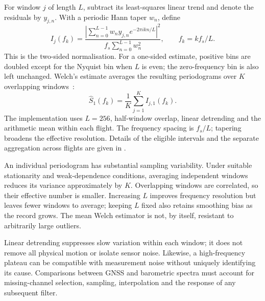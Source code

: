 For window $j$ of length $L$, subtract its least-squares linear trend and denote the
residuals by $y_{j,n}$. With a periodic Hann taper $w_n$, define
\begin{equation}
 I_j(f_k)=\frac{\left|\sum_{n=0}^{L-1}w_n y_{j,n}
                    e^{-2\pi i kn/L}\right|^2}
                   {f_s\sum_{n=0}^{L-1}w_n^2},\qquad f_k=kf_s/L.
\end{equation}
This is the two-sided normalisation. For a one-sided estimate, positive bins are
doubled except for the Nyquist bin when $L$ is even; the zero-frequency bin is
also left unchanged. Welch's estimate averages the resulting periodograms over
$K$ overlapping windows~\cite{welch1967}:
\begin{equation}
 \widehat S_1(f_k)=\frac1K\sum_{j=1}^{K}I_{j,1}(f_k).
 \label{eq:welch-estimator}
\end{equation}
The implementation uses $L=256$, half-window overlap, linear detrending and the
arithmetic mean within each flight. The frequency spacing is $f_s/L$; tapering
broadens the effective resolution. Details of the eligible intervals and the
separate aggregation across flights are given in .

An individual periodogram has substantial sampling variability. Under suitable
stationarity and weak-dependence conditions, averaging independent windows reduces
its variance approximately by $K$. Overlapping windows are correlated, so their
effective number is smaller. Increasing $L$ improves frequency resolution but
leaves fewer windows to average; keeping $L$ fixed also retains smoothing bias
as the record grows. The mean Welch estimator is not, by itself, resistant to
arbitrarily large outliers.

Linear detrending suppresses slow variation within each window; it does not remove
all physical motion or isolate sensor noise. Likewise, a high-frequency plateau
can be compatible with measurement noise without uniquely identifying its cause.
Comparisons between GNSS and barometric spectra must account for missing-channel
selection, sampling, interpolation and the response of any subsequent filter.
